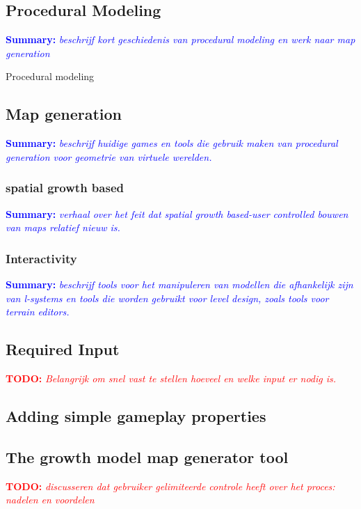 \documentclass{article}
\newcommand{\todo}[1]{\textcolor{red}{\textbf{\newline TODO: }\it{#1} \newline}}
\newcommand{\inhoud}[1]{\textcolor{blue}{\textbf{\newline Summary: }\it{#1}}}
\begin{document}
\subsection{Procedural Modeling}
\inhoud{beschrijf kort geschiedenis van procedural modeling en werk naar map generation}

Procedural modeling                        



\cite{citysurvey}




\subsection{Map generation}
\inhoud{beschrijf huidige games en tools die gebruik maken van procedural generation voor geometrie van virtuele werelden.}

\subsubsection{spatial growth based}
\inhoud{verhaal over het feit dat spatial growth based-user controlled bouwen van maps relatief nieuw is.}

\subsubsection{Interactivity}
\inhoud{beschrijf tools voor het manipuleren van modellen die afhankelijk zijn van l-systems en tools die worden 
	gebruikt voor level design, zoals tools voor terrain editors.}


\subsection{Required Input}
\todo{Belangrijk om snel vast te stellen hoeveel en welke input er nodig is.}



\subsection{Adding simple gameplay properties}

\subsection{The growth model map generator tool}
\todo{discusseren dat gebruiker gelimiteerde controle heeft over het proces: nadelen en voordelen}
\end{document}
